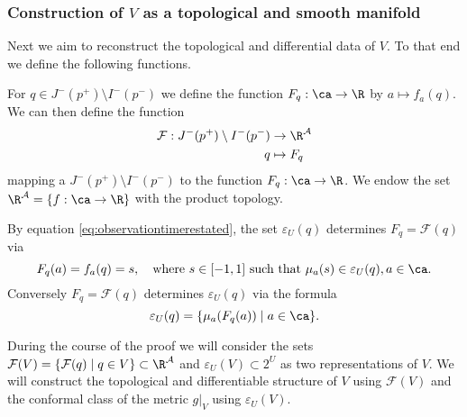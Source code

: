 \subsubsection{Construction of $V$ as a topological and smooth manifold}
Next we aim to reconstruct the topological and differential data of $V$. To that end we define the following functions.

For $q\in J^-(p^+)\setminus I^-(p^-)$ we define the function $F_q:\ca\to\R$ by $a\mapsto f_a(q)$. We can then define the function 
\begin{align*}
    \mathcal{F}:J^-(p^+)\setminus I^-(p^-) &\to \R^\mathcal{A}\\
    q&\mapsto F_q
\end{align*} mapping a $J^-(p^+)\setminus I^-(p^-)$ to the function $F_q:\ca\to\R$. We endow the set $\R^\mathcal{A} = \{f:\ca\to \R\}$ with the product topology.

By equation \eqref{eq:observationtimerestated}, the set $\varepsilon_U(q)$ determines $F_q=\mathcal{F}(q)$ via
\begin{equation}\label{eq:epsdetfq}
    F_q(a) = f_a(q) = s,\quad \text{where $s\in [-1,1]$ such that $\mu_a(s)\in \varepsilon_U(q), a\in \ca$}.
\end{equation}
Conversely $F_q=\mathcal{F}(q)$ determines $\varepsilon_U(q)$ via the formula
\begin{equation}\label{eq:fqdeteps}
    \varepsilon_U(q) = \{\mu_a(F_q(a)) \mid a\in \ca\}.
\end{equation}

During the course of the proof we will consider the sets $\mathcal{F}(V) = \{\mathcal{F}(q) \mid q\in V\}\subset \R^\mathcal{A}$ and $\varepsilon_U(V)\subset 2^U$ as two representations of $V$. We will construct the topological and differentiable structure of $V$ using $\mathcal{F}(V)$ and the conformal class of the metric $g\rvert_V$ using $\varepsilon_U(V)$.

